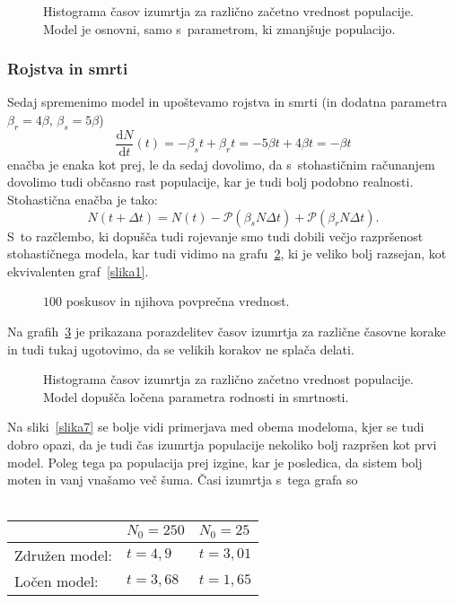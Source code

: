 \documentclass[a4paper,pdftex,11pt]{article}
\numberwithin{figure}{section} %
\begin{document}
\begin{figure}    
    \centering 
    \resizebox{0.49\textwidth}{!}{} 
    \resizebox{0.49\textwidth}{!}{} 
    \caption{Histograma časov izumrtja za različno začetno vrednost populacije. Model
    je osnovni, samo s~parametrom, ki zmanjšuje populacijo.}
    \label{slika4}
\end{figure}

\subsubsection*{Rojstva in smrti}
Sedaj spremenimo model in upoštevamo rojstva in smrti (in dodatna parametra $\beta_r = 
4\beta$, $\beta_s = 5\beta$)
\begin{equation}
    \frac{\mathrm{d} N}{\mathrm{d} t} (t) = - \beta_s t + \beta_r t = -5\beta t + 4 \beta t
    = -\beta t
\end{equation}
enačba je enaka kot prej, le da sedaj dovolimo, da s~stohastičnim računanjem dovolimo
tudi občasno rast populacije, kar je tudi bolj podobno realnosti.
Stohastična enačba je tako:
\begin{equation}
    N (t + \Delta t) = N(t) - \mathcal{P}(\beta_s N \Delta t) + 
    \mathcal{P}(\beta_r N \Delta t).
\end{equation}
S~to razčlembo, ki dopušča tudi rojevanje smo tudi dobili večjo razpršenost stohastičnega 
modela, kar tudi vidimo na grafu~\ref{slika5}, ki je veliko bolj razsejan, kot ekvivalenten 
graf~\ref{slika1}.
\begin{figure}[H]
    \centering
    \resizebox{0.65\linewidth}{!}{}
    \caption{$100$ poskusov in njihova povprečna vrednost.}
    \label{slika5}
\end{figure}
Na grafih~\ref{slika6} je prikazana porazdelitev časov izumrtja za različne časovne korake 
in tudi tukaj ugotovimo, da se velikih korakov ne splača delati.

\begin{figure}    
    \centering 
    \resizebox{0.49\textwidth}{!}{} 
    \resizebox{0.49\textwidth}{!}{} 
    \caption{Histograma časov izumrtja za različno začetno vrednost populacije. Model
    dopušča ločena parametra rodnosti in smrtnosti.}
    \label{slika6}
\end{figure}
Na sliki~\ref{slika7} se bolje vidi primerjava med obema modeloma, kjer se tudi dobro
opazi, da je tudi čas izumrtja populacije nekoliko bolj razpršen kot prvi model. Poleg
tega pa populacija prej izgine, kar je posledica, da sistem bolj moten in vanj vnašamo več
šuma. Časi izumrtja s~tega grafa so \\
\\
\begin{tabularx}{\textwidth}{ |X|X|X| }
    \hline
    $\quad$ & $N_0 = 250$ & $N_0 = 25$ \\ 
    \hline 
    Združen model: & $t = 4,9$ & $t = 3,01$ \\ 
    \hline 
    Ločen model: & $t = 3,68$ & $t = 1,65$ \\ 
    \hline
\end{tabularx}
\end{document}
